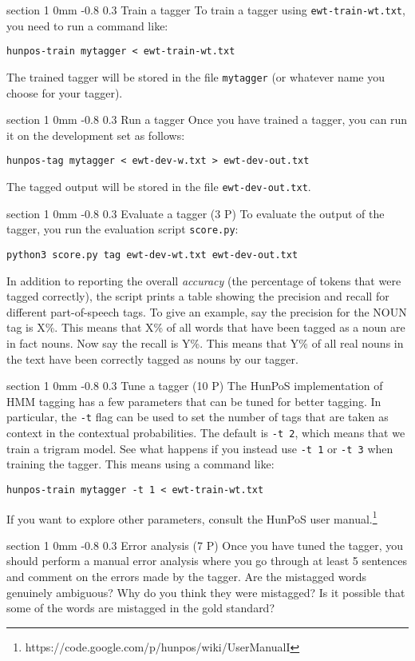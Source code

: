 \documentclass[11pt]{article}
\makeatletter
\newcommand{\newsec}[2]{\section{#1}\label{sec:#2}\noindent}
\renewcommand{\section}{\@startsection
{section}%
{1}%
{0mm}%
{-0.8\baselineskip}%
{0.3\baselineskip}%
{\bfseries\large}}%
\makeatother
\begin{document}
\newsec{Train a tagger}{train}%
To train a tagger using {\tt ewt-train-wt.txt}, you need to run a command like:
\begin{verbatim}
hunpos-train mytagger < ewt-train-wt.txt
\end{verbatim}
The trained tagger will be stored in the file {\tt mytagger} (or whatever name you choose for your tagger).

\newsec{Run a tagger}{run}%
Once you have trained a tagger, you can run it on the development set as follows:
\begin{verbatim}
hunpos-tag mytagger < ewt-dev-w.txt > ewt-dev-out.txt
\end{verbatim}
The tagged output will be stored in the file {\tt ewt-dev-out.txt}.

\newsec{Evaluate a tagger (3 P)}{eval}%
To evaluate the output of the tagger, you run the evaluation script {\tt score.py}:
\begin{verbatim}
python3 score.py tag ewt-dev-wt.txt ewt-dev-out.txt
\end{verbatim}
In addition to reporting the overall \emph{accuracy} (the percentage of tokens that were tagged correctly), the script prints a table showing the precision and recall for different part-of-speech tags. To give an example, say the precision for the NOUN tag is X\%. This means that X\% of all words that have been tagged as a noun are in fact nouns. Now say the recall is Y\%. This means that Y\% of all real nouns in the text have been correctly tagged as nouns by our tagger.

\newsec{Tune a tagger (10 P)}{tune}%
The HunPoS implementation of HMM tagging has a few parameters that can be tuned for better tagging. In particular, the {\tt -t} flag can be used to set the number of
tags that are taken as context in the contextual probabilities. The default is {\tt -t $\!\!$2}, which means that we train a trigram model. See what happens if you instead use {\tt -t $\!\!$1} or
{\tt -t $\!\!$3} when training the tagger. This means using a command like:
\begin{verbatim}
hunpos-train mytagger -t 1 < ewt-train-wt.txt
\end{verbatim}
If you want to explore other parameters, consult the HunPoS user manual.\footnote{https://code.google.com/p/hunpos/wiki/UserManualI}

\newsec{Error analysis (7 P)}{error}%
Once you have tuned the tagger, you should perform a manual error analysis where you go through at least 5 sentences and comment on the errors made by the tagger.
Are the mistagged words genuinely ambiguous? Why do you think they were mistagged? Is it possible that some of the words are mistagged in the gold standard?
\end{document}
